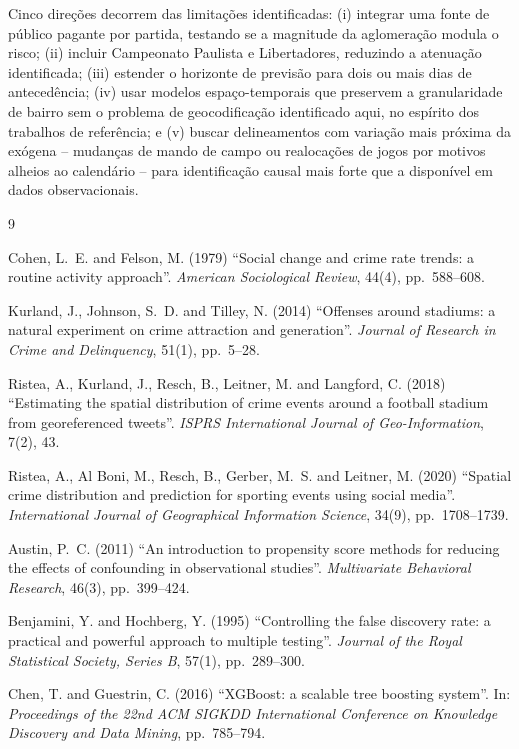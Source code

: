 \documentclass[12pt]{article}
\begin{document}
Cinco direções decorrem das limitações identificadas: (i) integrar uma
fonte de público pagante por partida, testando se a magnitude da
aglomeração modula o risco; (ii) incluir Campeonato Paulista e
Libertadores, reduzindo a atenuação identificada; (iii) estender o
horizonte de previsão para dois ou mais dias de antecedência; (iv) usar
modelos espaço-temporais que preservem a granularidade de bairro sem o
problema de geocodificação identificado aqui, no espírito dos trabalhos
de referência; e (v) buscar delineamentos com variação mais próxima da
exógena -- mudanças de mando de campo ou realocações de jogos por motivos
alheios ao calendário -- para identificação causal mais forte que a
disponível em dados observacionais.

\begin{thebibliography}{9}

 Cohen, L.~E. and Felson, M. (1979) ``Social change and
crime rate trends: a routine activity approach''. \emph{American
Sociological Review}, 44(4), pp.~588--608.

 Kurland, J., Johnson, S.~D. and Tilley, N. (2014)
``Offenses around stadiums: a natural experiment on crime attraction and
generation''. \emph{Journal of Research in Crime and Delinquency}, 51(1),
pp.~5--28.

 Ristea, A., Kurland, J., Resch, B., Leitner, M. and
Langford, C. (2018) ``Estimating the spatial distribution of crime events
around a football stadium from georeferenced tweets''. \emph{ISPRS
International Journal of Geo-Information}, 7(2), 43.

 Ristea, A., Al Boni, M., Resch, B., Gerber, M.~S. and
Leitner, M. (2020) ``Spatial crime distribution and prediction for sporting
events using social media''. \emph{International Journal of Geographical
Information Science}, 34(9), pp.~1708--1739.

 Austin, P.~C. (2011) ``An introduction to propensity
score methods for reducing the effects of confounding in observational
studies''. \emph{Multivariate Behavioral Research}, 46(3), pp.~399--424.

 Benjamini, Y. and Hochberg, Y. (1995) ``Controlling the
false discovery rate: a practical and powerful approach to multiple
testing''. \emph{Journal of the Royal Statistical Society, Series B},
57(1), pp.~289--300.

 Chen, T. and Guestrin, C. (2016) ``XGBoost: a scalable
tree boosting system''. In: \emph{Proceedings of the 22nd ACM SIGKDD
International Conference on Knowledge Discovery and Data Mining},
pp.~785--794.


\end{thebibliography}
\end{document}
